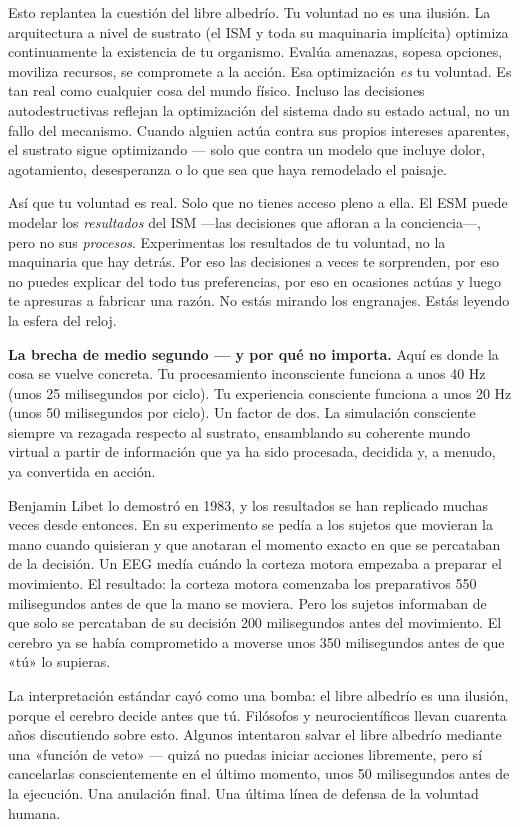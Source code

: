 \documentclass[11pt, twoside, openright]{book}
\begin{document}
Esto replantea la cuestión del libre albedrío. Tu voluntad no es una ilusión. La arquitectura a nivel de sustrato (el ISM y toda su maquinaria implícita) optimiza continuamente la existencia de tu organismo. Evalúa amenazas, sopesa opciones, moviliza recursos, se compromete a la acción. Esa optimización \textit{es} tu voluntad. Es tan real como cualquier cosa del mundo físico. Incluso las decisiones autodestructivas reflejan la optimización del sistema dado su estado actual, no un fallo del mecanismo. Cuando alguien actúa contra sus propios intereses aparentes, el sustrato sigue optimizando --- solo que contra un modelo que incluye dolor, agotamiento, desesperanza o lo que sea que haya remodelado el paisaje.

Así que tu voluntad es real. Solo que no tienes acceso pleno a ella. El ESM puede modelar los \textit{resultados} del ISM ---las decisiones que afloran a la conciencia---, pero no sus \textit{procesos}. Experimentas los resultados de tu voluntad, no la maquinaria que hay detrás. Por eso las decisiones a veces te sorprenden, por eso no puedes explicar del todo tus preferencias, por eso en ocasiones actúas y luego te apresuras a fabricar una razón. No estás mirando los engranajes. Estás leyendo la esfera del reloj.

\textbf{La brecha de medio segundo --- y por qué no importa.} Aquí es donde la cosa se vuelve concreta. Tu procesamiento inconsciente funciona a unos 40 Hz (unos 25 milisegundos por ciclo). Tu experiencia consciente funciona a unos 20 Hz (unos 50 milisegundos por ciclo). Un factor de dos. La simulación consciente siempre va rezagada respecto al sustrato, ensamblando su coherente mundo virtual a partir de información que ya ha sido procesada, decidida y, a menudo, ya convertida en acción.

Benjamin Libet lo demostró en 1983, y los resultados se han replicado muchas veces desde entonces. En su experimento se pedía a los sujetos que movieran la mano cuando quisieran y que anotaran el momento exacto en que se percataban de la decisión. Un EEG medía cuándo la corteza motora empezaba a preparar el movimiento. El resultado: la corteza motora comenzaba los preparativos 550 milisegundos antes de que la mano se moviera. Pero los sujetos informaban de que solo se percataban de su decisión 200 milisegundos antes del movimiento. El cerebro ya se había comprometido a moverse unos 350 milisegundos antes de que «tú» lo supieras.

La interpretación estándar cayó como una bomba: el libre albedrío es una ilusión, porque el cerebro decide antes que tú. Filósofos y neurocientíficos llevan cuarenta años discutiendo sobre esto. Algunos intentaron salvar el libre albedrío mediante una «función de veto» --- quizá no puedas iniciar acciones libremente, pero sí cancelarlas conscientemente en el último momento, unos 50 milisegundos antes de la ejecución. Una anulación final. Una última línea de defensa de la voluntad humana.
\end{document}
